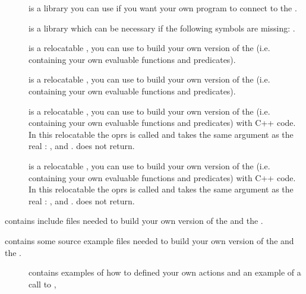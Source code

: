 \begin{description}
\begin{description}

\item [] is a library you can use if you want your own program to
connect to the \MP{}.

\item [] is a library which can be necessary if the following
symbols are missing: \*
.

\item [] is a relocatable \CPK{},  you can use
to build your own version of the \CPK{} (i.e. containing your own evaluable
functions and predicates).

\item [] is a relocatable \XPK{},  you can use
to build your own version of the \XPK{} (i.e. containing your own evaluable
functions and predicates).

\item [] is a relocatable \CPK{},  you can use
to build your own version of the \CPK{} (i.e. containing your own evaluable
functions and predicates) with C++ code. In this relocatable the oprs
 is called  and takes the same argument as the real
: ,  and .  does not
return.

\item [] is a relocatable \XPK{}, you can use
to build your own version of the \XPK{} (i.e. containing your own evaluable
functions and predicates) with C++ code. In this relocatable the oprs
 is called  and takes the same argument as the real
: ,  and .  does not
return. 

\end{description}

\item [\file{include}] contains include files needed to build your own
version of the \XPK{} and the \CPK{}.

\item [\file{pub\_src}] contains some source example files needed to build your own
version of the \XPK{} and the \CPK{}.

\begin{description}

\item [] contains examples of how to defined your own
actions and an example of a call to ,


\end{description}
\end{description}

